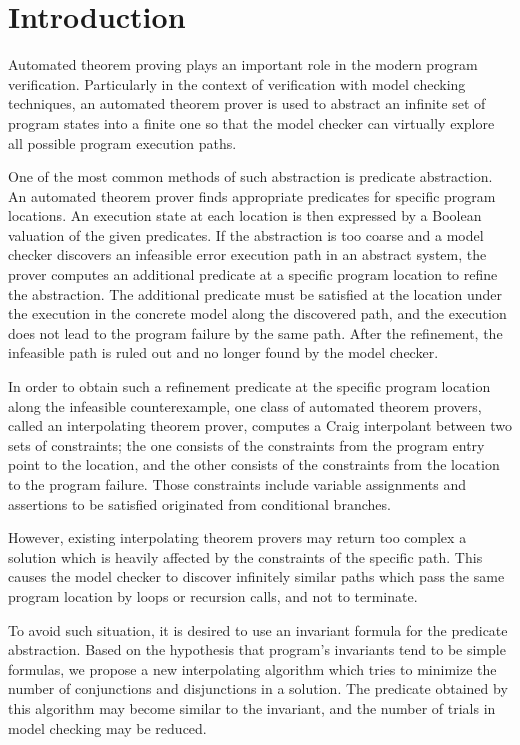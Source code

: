\documentclass[master,final,12pt]{iscs-thesis}
\begin{document}
\mainmatter

\chapter{Introduction}

Automated theorem proving plays an important role in the modern
program verification.  Particularly in the context of verification
with model checking techniques, an automated theorem prover is used to
abstract an infinite set of program states into a finite one so that
the model checker can virtually explore all possible program execution
paths.

One of the most common methods of such abstraction is predicate
abstraction.  An automated theorem prover finds appropriate predicates
for specific program locations.  An execution state at each location
is then expressed by a Boolean valuation of the given predicates.  If
the abstraction is too coarse and a model checker discovers an
infeasible error execution path in an abstract system, the prover
computes an additional predicate at a specific program location to
refine the abstraction.  The additional predicate must be satisfied at
the location under the execution in the concrete model along the
discovered path, and the execution does not lead to the program
failure by the same path.  After the refinement, the infeasible path
is ruled out and no longer found by the model checker.

In order to obtain such a refinement predicate at the specific program
location along the infeasible counterexample, one class of automated
theorem provers, called an interpolating theorem prover, computes a
Craig interpolant between two sets of constraints; the one consists of
the constraints from the program entry point to the location, and the
other consists of the constraints from the location to the program
failure.  Those constraints include variable assignments and assertions
to be satisfied originated from conditional branches.

However, existing interpolating theorem provers may return too complex
a solution which is heavily affected by the constraints of the
specific path.  This causes the model checker to discover infinitely
similar paths which pass the same program location by loops or
recursion calls, and not to terminate.

To avoid such situation, it is desired to use an invariant formula for
the predicate abstraction.  Based on the hypothesis that program’s
invariants tend to be simple formulas, we propose a new interpolating
algorithm which tries to minimize the number of conjunctions and
disjunctions in a solution.  The predicate obtained by this algorithm
may become similar to the invariant, and the number of trials in model
checking may be reduced.
\end{document}
